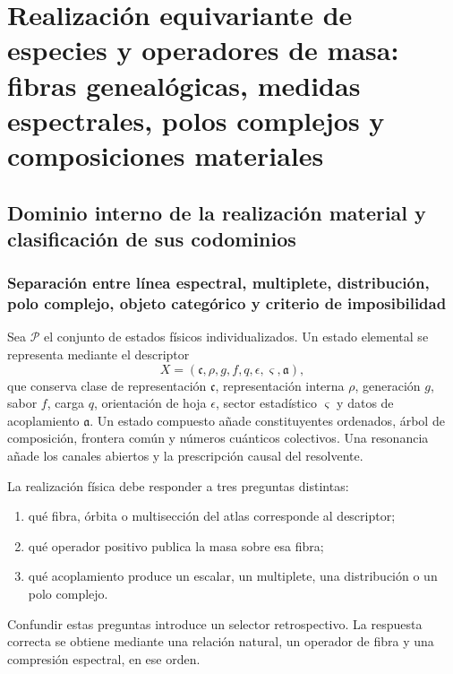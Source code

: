 
\chapter{Realización equivariante de especies y operadores de masa: fibras genealógicas, medidas espectrales, polos complejos y composiciones materiales}
\label{hmtmasscl:chap-realizacion-equiv}

\section{Dominio interno de la realización material y clasificación de sus codominios}

\subsection{Separación entre línea espectral, multiplete, distribución, polo complejo, objeto categórico y criterio de imposibilidad}

Sea \(\mathcal P\) el conjunto de estados físicos individualizados. Un estado
elemental se representa mediante el descriptor
\[
 X=(\mathfrak c,\rho,g,f,q,\epsilon,\varsigma,\mathfrak a),
\]
que conserva clase de representación \(\mathfrak c\), representación interna
\(\rho\), generación \(g\), sabor \(f\), carga \(q\), orientación de hoja
\(\epsilon\), sector estadístico \(\varsigma\) y datos de acoplamiento
\(\mathfrak a\). Un estado compuesto añade constituyentes ordenados, árbol de
composición, frontera común y números cuánticos colectivos. Una resonancia
añade los canales abiertos y la prescripción causal del resolvente.

La realización física debe responder a tres preguntas distintas:

\begin{enumerate}
\item qué fibra, órbita o multisección del atlas corresponde al descriptor;
\item qué operador positivo publica la masa sobre esa fibra;
\item qué acoplamiento produce un escalar, un multiplete, una distribución o
      un polo complejo.
\end{enumerate}

Confundir estas preguntas introduce un selector retrospectivo. La respuesta
correcta se obtiene mediante una relación natural, un operador de fibra y una
compresión espectral, en ese orden.

